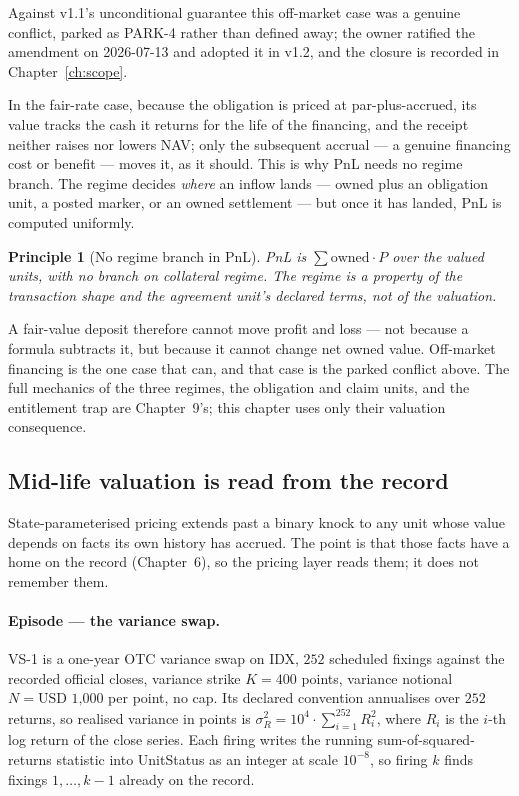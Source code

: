 \documentclass[11pt,a4paper]{article}
\newcommand{\USD}[1]{\mbox{USD~#1}}
\newtheorem{principle}[definition]{Principle}
\begin{document}
Against v1.1's unconditional guarantee this off-market case was a genuine conflict,
parked as PARK-4 rather than defined away; the owner ratified the amendment on
2026-07-13 and adopted it in v1.2, and the closure is recorded in
Chapter~\ref{ch:scope}.

In the fair-rate case, because the obligation is priced at par-plus-accrued, its
value tracks the cash it returns for the life of the financing, and the receipt
neither raises nor lowers NAV; only the subsequent accrual --- a genuine
financing cost or
benefit --- moves it, as it should. This is why PnL needs no regime branch. The
regime decides \emph{where} an inflow lands --- owned plus an obligation unit,
a posted marker, or an owned settlement --- but once it has landed, PnL is
computed uniformly.

\begin{principle}[No regime branch in PnL]
PnL is $\sum \mathrm{owned}\cdot P$ over the valued units, with no branch on
collateral regime. The regime is a property of the transaction shape and the
agreement unit's declared terms, not of the valuation.
\end{principle}

A fair-value deposit therefore cannot move profit and loss --- not because a
formula subtracts it, but because it cannot change net owned value. Off-market
financing is the one case that can, and that case is the parked conflict above.
The full mechanics of the three regimes, the obligation and claim units, and
the entitlement trap are Chapter~9's; this chapter uses only their valuation
consequence.

\subsection{Mid-life valuation is read from the record}

State-parameterised pricing extends past a binary knock to any unit whose value
depends on facts its own history has accrued. The point is that those facts
have a home on the record (Chapter~6), so the pricing layer reads them; it does
not remember them.

\paragraph{Episode --- the variance swap.}
VS-1 is a one-year OTC variance swap on IDX, $252$ scheduled fixings against
the recorded official closes, variance strike $K = 400$ points, variance
notional $N = \USD{1,000}$ per point, no cap. Its declared convention
annualises over $252$ returns, so realised variance in points is
$\sigma^2_R = 10^4 \cdot \sum_{i=1}^{252} R_i^2$, where $R_i$ is the $i$-th log
return of the close series. Each firing writes the running
sum-of-squared-returns statistic into UnitStatus as an integer at scale
$10^{-8}$, so firing $k$ finds fixings $1,\dots,k-1$ already on the record.
\end{document}
